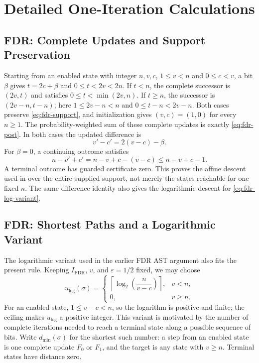 \section{Detailed One-Iteration Calculations}
\label{app:calculations}

\subsection{FDR: Complete Updates and Support Preservation}
Starting from an enabled state with integer $n,v,c$,
$1\leq v<n$ and $0\leq c<v$, a bit $\beta$ gives
$t=2c+\beta$ and $0\leq t<2v<2n$.
If $t<n$, the complete successor is $(2v,t)$ and satisfies
$0\leq t<\min(2v,n)$. If $t\geq n$, the successor is
$(2v-n,t-n)$; here $1\leq2v-n<n$ and
$0\leq t-n<2v-n$. Both cases preserve \eqref{eq:fdr-support}, and
initialization gives $(v,c)=(1,0)$ for every $n\geq1$.
The probability-weighted sum of these complete updates is exactly
\eqref{eq:fdr-post}. In both cases the updated difference is
\[
 v'-c'=2(v-c)-\beta.
\]
For $\beta=0$, a continuing outcome satisfies
\[
 n-v'+c'=n-v+c-(v-c)\leq n-v+c-1.
\]
A terminal outcome has guarded certificate zero. This proves the
affine descent used in  over the entire supplied support,
not merely the states reachable for one fixed $n$.
The same difference identity also gives the logarithmic descent for
\eqref{eq:fdr-log-variant}.

\subsection{FDR: Shortest Paths and a Logarithmic Variant}
\label{app:fdr-log-variant}
The logarithmic variant used in the earlier FDR AST argument
\cite{zilken2026verifyingsamplingalgorithmsdistributional} also fits
the present rule. Keeping $I_{\mathrm{FDR}}$, $v$, and
$\varepsilon=1/2$ fixed, we may choose
\begin{equation}
 u_{\log}(\sigma)=
 \begin{cases}
 \left\lceil\log_2\!\left(\dfrac{n}{v-c}\right)\right\rceil,&v<n,\\
 0,&v\geq n.
 \end{cases}
 \label{eq:fdr-log-variant}
\end{equation}
For an enabled state, $1\leq v-c<n$, so the logarithm is positive
and finite; the ceiling makes $u_{\log}$ a positive integer.
This variant is motivated by the number of complete iterations needed
to reach a terminal state along a possible sequence of bits.
Write $d_{\min}(\sigma)$ for the shortest such number: a step from
an enabled state is one complete update $F_0$ or $F_1$, and the target
is any state with $v\geq n$. Terminal states have distance zero.

